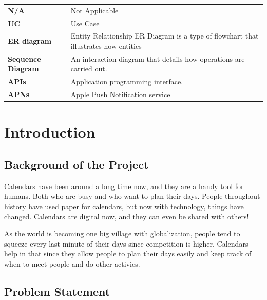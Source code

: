 \documentclass[12pt,a4paper]{report}
\begin{document}
\begin{singlespace}
\begin{center}
\begin{longtable}{p{}p{}}
    \textbf{N/A} & Not Applicable \\[1ex]
    
    \textbf{UC} & Use Case \\[1ex]
    
    \textbf{ER diagram} & Entity Relationship ER Diagram is a type of flowchart that illustrates how entities \\[1ex]
    
    \textbf{Sequence Diagram} & An interaction diagram that details how operations are carried out. \\[1ex]
    
    \textbf{APIs} & Application programming interface. \\[1ex]
    
    \textbf{APNs} & Apple Push Notification service \\
    
    \bottomrule
    \end{longtable}
\end{center}

\end{singlespace}


\chapter{Introduction}


\section{Background of the Project}

Calendars have been around a long time now, and they are a handy tool for humans. Both who are busy and who want to plan their days. People throughout history have used paper for calendars, but now with technology, things have changed. Calendars are digital now, and they can even be shared with others!

As the world is becoming one big village with globalization, people tend to squeeze every last minute of their days since competition is higher. Calendars help in that since they allow people to plan their days easily and keep track of when to meet people and do other activies.

\section{Problem Statement}
\end{document}
